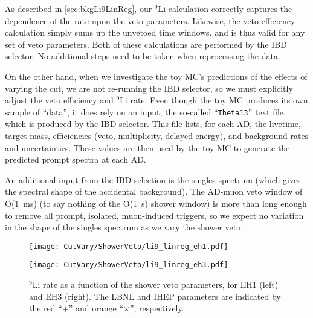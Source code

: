 \documentclass[../thesis.tex]{subfiles}
\begin{document}
As described in \autoref{sec:bkgLi9LinReg}, our $^9$Li calculation correctly captures the dependence of the rate upon the veto parameters. Likewise, the veto efficiency calculation simply sums up the unvetoed time windows, and is thus valid for any set of veto parameters. Both of these calculations are performed by the IBD selector. No additional steps need to be taken when reprocessing the data.

On the other hand, when we investigate the toy MC's predictions of the effects of varying the cut, we are not re-running the IBD selector, so we must explicitly adjust the veto efficiency and $^9$Li rate. Even though the toy MC produces its own sample of ``data'', it does rely on an input, the so-called ``\texttt{Theta13}'' text file, which is produced by the IBD selector. This file lists, for each AD, the livetime, target mass, efficiencies (veto, multiplicity, delayed energy), and background rates and uncertainties. These values are then used by the toy MC to generate the predicted prompt spectra at each AD\@.

An additional input from the IBD selection is the singles spectrum (which gives the spectral shape of the accidental background). The AD-muon veto window of O(1~ms) (to say nothing of the O(1~s) shower window) is more than long enough to remove all prompt, isolated, muon-induced triggers, so we expect no variation in the shape of the singles spectrum as we vary the shower veto.

\newcommand\marknom{The LBNL and IHEP parameters are indicated by the red ``$+$'' and orange ``$\times$'', respectively.}

\begin{figure}[ht]
  \begin{minipage}{0.5\linewidth}%
    \texttt{[image: CutVary/ShowerVeto/li9\_linreg\_eh1.pdf]}%
  \end{minipage}%
  \begin{minipage}{0.5\linewidth}%
    \texttt{[image: CutVary/ShowerVeto/li9\_linreg\_eh3.pdf]}%
  \end{minipage}%
  \caption{$^9$Li rate as a function of the shower veto parameters, for EH1 (left) and EH3 (right). \marknom}
  \label{fig:cutVaryVetoEffLi9Rates}
\end{figure}
\end{document}
